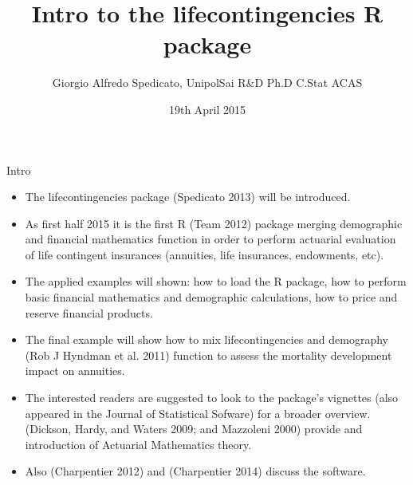 \documentclass[ignorenonframetext,]{beamer}
\title{Intro to the lifecontingencies R package}
\author{Giorgio Alfredo Spedicato, UnipolSai R\&D Ph.D C.Stat ACAS}
\date{19th April 2015}
\begin{document}
\frame{\titlepage}

\begin{frame}
\tableofcontents[hideallsubsections]
\end{frame}

\begin{frame}{Intro}

\begin{itemize}[<+->]
\itemsep1pt\parskip0pt
\item
  The lifecontingencies package (Spedicato 2013) will be introduced.
\item
  As first half 2015 it is the first R (Team 2012) package merging
  demographic and financial mathematics function in order to perform
  actuarial evaluation of life contingent insurances (annuities, life
  insurances, endowments, etc).
\item
  The applied examples will shown: how to load the R package, how to
  perform basic financial mathematics and demographic calculations, how
  to price and reserve financial products.
\end{itemize}

\end{frame}

\begin{frame}

\begin{itemize}[<+->]
\itemsep1pt\parskip0pt
\item
  The final example will show how to mix lifecontingencies and
  demography (Rob J Hyndman et al. 2011) function to assess the
  mortality development impact on annuities.
\item
  The interested readers are suggested to look to the package's
  vignettes (also appeared in the Journal of Statistical Sofware) for a
  broader overview. (Dickson, Hardy, and Waters 2009; and Mazzoleni
  2000) provide and introduction of Actuarial Mathematics theory.
\item
  Also (Charpentier 2012) and (Charpentier 2014) discuss the software.
\end{itemize}

\end{frame}
\end{document}
